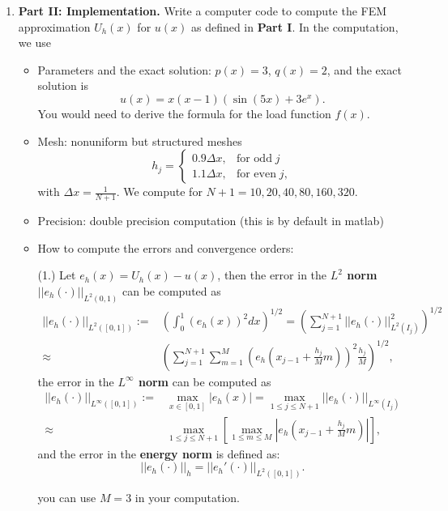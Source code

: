 \documentclass[11pt]{article}      %
\begin{document}
\begin{enumerate}
\item[]{\bf Part II: Implementation.}  Write a computer code to compute the FEM approximation $U_h(x)$ for $u(x)$ as defined in {\bf Part I}. In the computation, we use
\begin{itemize}
%
\item {\sf Parameters and the exact solution:} $p(x)=3$, $q(x)=2$, and the exact solution is
\begin{equation}
u(x)=x(x-1)(\sin(5x)+3e^x).
\label{eq:exa}
\end{equation}
You would need to derive the formula for the load function $f(x)$.
%
\item {\sf Mesh:} 
nonuniform but structured meshes
\begin{displaymath}
h_{j}=
\left\{
\begin{array}{ll}
0.9\Delta x, & {\textrm {for odd}}\; j\\
1.1\Delta x,& {\textrm {for even}}\; j,
\end{array}
\right.
\end{displaymath}
with $\Delta x=\frac{1}{N+1}$. We compute for $N+1=10, 20, 40, 80, 160, 320$.
%
\item {\sf Precision:} double precision computation ({\sf this is by default in matlab})
%
\item {\sf How to compute the errors and convergence orders:}


(1.) Let $e_h(x)=U_h(x)-u(x)$, then the error in  the {\bf $L^2$ norm} $||e_h(\cdot)||_{L^2(0,1)}$ can be computed as
{\small
\begin{align*}
||e_h(\cdot)||_{L^2([0,1])}:=&\left(\int_0^1 (e_h(x))^2dx\right)^{1/2}= \left(\sum_{j=1}^{N+1}||e_h(\cdot)||^2_{L^2(I_j)}\right)^{1/2}\\
\approx&\left(\sum_{j=1}^{N+1}\sum_{m=1}^{M}\left(e_h(x_{j-1}+\frac{h_j}{M} m)\right)^2 \frac{h_j}{M}\right)^{1/2},
\end{align*}
}
the error in the {\bf  $L^{\infty}$ norm} can be computed as
{\small
\begin{align*}
||e_h(\cdot)||_{L^\infty([0,1])}:=&\max_{x\in[0,1]}|e_h(x)|=\max_{1\leq j\leq N+1} ||e_h(\cdot)||_{L^\infty(I_j)}\\
\approx &\max_{1\leq j\leq N+1}\left[\max_{1\leq m\leq M}|e_h(x_{j-1}+\frac{h_j}{M} m)|\right],
\end{align*}
}
and the error in the {\bf energy norm} is defined as:
$$
||e_h(\cdot)||_{h}=||e_h'(\cdot)||_{L^2([0,1])}.
$$

you can use $M=3$ in your computation.
%


\end{itemize}
\end{enumerate}
\end{document}
